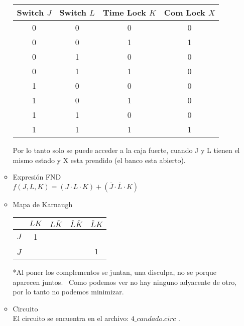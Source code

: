 \documentclass[12pt]{article}
\begin{document}
\begin{enumerate}
\begin{itemize}
  			\begin{table}[h!]
  				\centering
  				\begin{tabular}{|c|c|c|c|}
  					\hline
  					Switch $J$ & Switch $L$ & Time Lock $K$ & Com Lock $X$ \\ \hline
  					0        & 0        & 0           & 0          \\ \hline
  					0        & 0        & 1           & 1          \\ \hline
  					0        & 1        & 0           & 0          \\ \hline
  					0        & 1        & 1           & 0          \\ \hline
  					1        & 0        & 0           & 0          \\ \hline
  					1        & 0        & 1           & 0          \\ \hline
  					1        & 1        & 0           & 0          \\ \hline
  					1        & 1        & 1           & 1          \\ \hline
  				\end{tabular}
  			\end{table}
  			Por lo tanto solo se puede acceder a la caja fuerte, cuando J y L tienen el mismo estado y X esta prendido (el banco esta abierto). \
  		\item Expresión FND \\
  			$f(J,L,K) = (J\cdot L\cdot K)+(\overline{J}\cdot \overline{L}\cdot K)$ \\
  		\item Mapa de Karnaugh \\
  			\begin{table}[h!]
  				\centering
  				\begin{tabular}{|c|c|c|c|c|}
  					\hline
  					& $LK$ & $L\overline{K}$ & $\overline{L}\overline{K}$ & $\overline{L}K$ \\ \hline
  					$J$  & 1  &    &      &    \\ \hline
  					$\overline{J}$ &    &     &      &  1  \\ \hline
  				\end{tabular}
  			\end{table}
  			*Al poner los complementos se juntan, una disculpa, no se porque aparecen juntos. \
  			Como podemos ver no hay ninguno adyacente de otro, por lo tanto no podemos minimizar.
  		\item Circuito \\
  			El circuito se encuentra en el archivo: $4\_candado.circ$ .
  	\end{itemize}
\end{enumerate}
\end{document}
